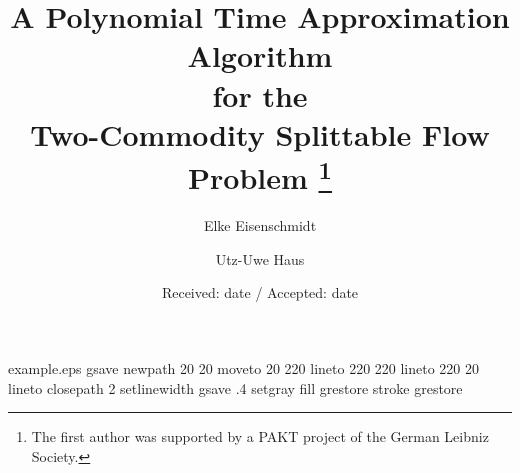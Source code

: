 \begin{filecontents*}{example.eps}
gsave
newpath
  20 20 moveto
  20 220 lineto
  220 220 lineto
  220 20 lineto
closepath
2 setlinewidth
gsave
  .4 setgray fill
grestore
stroke
grestore
\end{filecontents*}
\RequirePackage{fix-cm}
\documentclass{svjour3}
\def\makeheadbox{}
\smartqed
\usepackage{amsmath}
\usepackage{mathptmx}

\usepackage[utf8]{inputenc}
\usepackage{graphicx}
\usepackage{color}
\usepackage{datetime}

\usepackage{ifpdf}
\newcommand{\figinput}[1]{\ifpdf\else\fi}

\newtheorem{observation}{Observation}


\def\R{\mathbf{R}}
\def\Z{\mathbf{Z}}
\def\NP{{\ensuremath{\text{\textsc{NP}}}}}
\DeclareMathOperator{\conv}{conv}
\DeclareMathOperator{\dem}{dem}





\title{A Polynomial Time Approximation Algorithm\\ for the \\
  Two-Commodity Splittable Flow Problem
\thanks{The first author was supported by a PAKT project of the German
  Leibniz Society.}}
\author{Elke Eisenschmidt \and Utz-Uwe Haus}
\date{Received: date / Accepted: date}
\maketitle

\begin{abstract}
  We consider a generalization of the unsplittable maximum
  two-commodity flow problem on undirected graphs where each commodity
  $i\in\{1,2\}$ can be split into a bounded number $k_i$ of equally-sized chunks
  that can be routed on different paths. We show that in contrast to
  the single-commodity case this problem is \NP-hard, and hard to
  approximate to within a factor of $\alpha>1/2$. We
  present a polynomial time $1/2$-approximation algorithm for the case
  of uniform chunk size over both commodities and show that for even
  $k_i$ and a mild cut condition it can be modified to yield an exact
  method. The uniform case can be used to derive a $1/4$-approximation
  for the maximum concurrent $(k_1,k_2)$-splittable flow without chunk
  size restrictions for fixed demand ratios.

\end{abstract}


